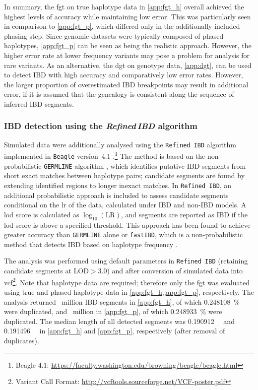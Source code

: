 In summary, the \gls{fgt} on true haplotype data in \cref{app:fgt_h} overall achieved the highest levels of accuracy while maintaining low error.
This was particularly seen in comparison to \cref{app:fgt_p}, which differed only in the additionally included phasing step.
Since genomic datasets were typically composed of phased haplotypes, \cref{app:fgt_p} can be seen as being the realistic approach.
However, the higher error rate at lower frequency variants may pose a problem for analysis for rare variants.
As an alternative, the \gls{dgt} on genotype data, \cref{app:dgt}, can be used to detect IBD with high accuracy and comparatively low error rates.
However, the larger proportion of overestimated IBD breakpoints may result in additional error, \eg if it is assumed that the genealogy is consistent along the sequence of inferred IBD segments.




%
\subsubsection{IBD detection using the \emph{Refined\,IBD} algorithm}
\label{sec:ibd_beagle_tru}
%

Simulated data were additionally analysed using the \texttt{Refined\,IBD} algorithm implemented in \texttt{Beagle} version~4.1 \citep{Browning:2013eh}.\footnote{Beagle 4.1: \url{https://faculty.washington.edu/browning/beagle/beagle.html} }
The method is based on the non-probabilistic \texttt{GERMLINE} algorithm \citep{Gusev:2009hd}, which identifies putative IBD segments from short exact matches between haplotype pairs; candidate segments are found by extending identified regions to longer inexact matches.
In \texttt{Refined\,IBD}, an additional probabilistic approach is included to assess candidate segments conditional on the \gls{lr} of the data, calculated under IBD and non-IBD models.
A \gls{lod} score is calculated as ${\log_{10}(\text{LR})}$, and segments are reported as IBD if the \gls{lod} score is above a specified threshold.
This approach has been found to achieve greater accuracy than \texttt{GERMLINE} alone or \texttt{fastIBD}, which is a non-probabilistic method that detects IBD based on haplotype frequency \citep{Browning:2011do,Browning:2013eh}.

The analysis was performed using default parameters in \texttt{Refined\,IBD} (retaining candidate segments at ${\mbox{LOD}>3.0}$) and after conversion of simulated data into \gls{vcf}\footnote{Variant Call Format: \url{http://vcftools.sourceforge.net/VCF-poster.pdf} }.
Note that haplotype data are required; therefore only the \gls{fgt} was evaluated using true and phased haplotype data in \cref{app:fgt_h,,app:fgt_p}, respectively.
The analysis returned ~million IBD segments in \ref{app:fgt_h}, of which \SI{0.248108}{\percent} were duplicated, and ~million in \ref{app:fgt_p}, of which \SI{0.248933}{\percent} were duplicated.
The median length of all detected segments was \SI{0.190912}{\mega\basepair} and \SI{0.191496}{\mega\basepair} in \ref{app:fgt_h} and \ref{app:fgt_p}, respectively (after removal of duplicates).

